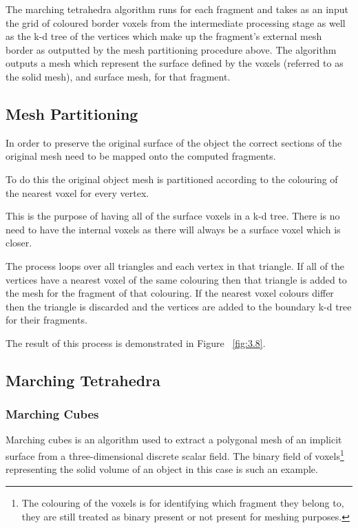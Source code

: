 The marching tetrahedra algorithm runs for each fragment and takes as an input the grid of coloured border voxels from the intermediate processing stage as well as the k-d tree of the vertices which make up the fragment's external mesh border as outputted by the mesh partitioning procedure above. The algorithm outputs a mesh which represent the surface defined by the voxels (referred to as the solid mesh), and surface mesh, for that fragment.

\subsection{Mesh Partitioning}

\label{sect:part}

In order to preserve the original surface of the object the correct sections of the original mesh need to be mapped onto the computed fragments.

To do this the original object mesh is partitioned according to the colouring of the nearest voxel for every vertex.

This is the purpose of having all of the surface voxels in a k-d tree. There is no need to have the internal voxels as there will always be a surface voxel which is closer.

The process loops over all triangles and each vertex in that triangle. If all of the vertices have a nearest voxel of the same colouring then that triangle is added to the mesh for the fragment of that colouring. If the nearest voxel colours differ then the triangle is discarded and the vertices are added to the boundary k-d tree for their fragments.

The result of this process is demonstrated in Figure ~\ref{fig:3.8}. 

\subsection{Marching Tetrahedra}

\subsubsection{Marching Cubes}

Marching cubes is an algorithm used to extract a polygonal mesh of an implicit surface from a three-dimensional discrete scalar field\cite{Lorensen:1987:MCH:37401.37422}. The binary field of voxels\footnote{The colouring of the voxels is for identifying which fragment they belong to, they are still treated as binary present or not present for meshing purposes.} representing the solid volume of an object in this case is such an example.

